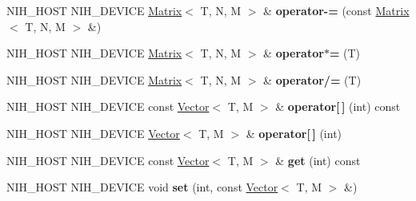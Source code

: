 \begin{DoxyCompactItemize}
\item 
\hypertarget{structnih_1_1_matrix_abb807e11d90f62076f083093ed4852c4}{
\-N\-I\-H\-\_\-\-H\-O\-S\-T \-N\-I\-H\-\_\-\-D\-E\-V\-I\-C\-E \hyperlink{structnih_1_1_matrix}{\-Matrix}$<$ \-T, \*
\-N, \-M $>$ \& {\bfseries operator-\/=} (const \hyperlink{structnih_1_1_matrix}{\-Matrix}$<$ \-T, \-N, \-M $>$ \&)}
\label{structnih_1_1_matrix_abb807e11d90f62076f083093ed4852c4}

\item 
\hypertarget{structnih_1_1_matrix_a2f749df29033f0659b3de33cca270b1d}{
\-N\-I\-H\-\_\-\-H\-O\-S\-T \-N\-I\-H\-\_\-\-D\-E\-V\-I\-C\-E \hyperlink{structnih_1_1_matrix}{\-Matrix}$<$ \-T, \*
\-N, \-M $>$ \& {\bfseries operator$\ast$=} (\-T)}
\label{structnih_1_1_matrix_a2f749df29033f0659b3de33cca270b1d}

\item 
\hypertarget{structnih_1_1_matrix_a0b8324135764fc785a39bcc7737c53f2}{
\-N\-I\-H\-\_\-\-H\-O\-S\-T \-N\-I\-H\-\_\-\-D\-E\-V\-I\-C\-E \hyperlink{structnih_1_1_matrix}{\-Matrix}$<$ \-T, \*
\-N, \-M $>$ \& {\bfseries operator/=} (\-T)}
\label{structnih_1_1_matrix_a0b8324135764fc785a39bcc7737c53f2}

\item 
\hypertarget{structnih_1_1_matrix_a7d8d41af5d8c106a2a62c27c6271c318}{
\-N\-I\-H\-\_\-\-H\-O\-S\-T \-N\-I\-H\-\_\-\-D\-E\-V\-I\-C\-E const \*
\hyperlink{structnih_1_1_vector}{\-Vector}$<$ \-T, \-M $>$ \& {\bfseries operator\mbox{[}$\,$\mbox{]}} (int) const }
\label{structnih_1_1_matrix_a7d8d41af5d8c106a2a62c27c6271c318}

\item 
\hypertarget{structnih_1_1_matrix_a4925f21801c31cc9388d6f8eb1f4ab96}{
\-N\-I\-H\-\_\-\-H\-O\-S\-T \-N\-I\-H\-\_\-\-D\-E\-V\-I\-C\-E \hyperlink{structnih_1_1_vector}{\-Vector}$<$ \-T, \*
\-M $>$ \& {\bfseries operator\mbox{[}$\,$\mbox{]}} (int)}
\label{structnih_1_1_matrix_a4925f21801c31cc9388d6f8eb1f4ab96}

\item 
\hypertarget{structnih_1_1_matrix_a395ae2b1d7ac2d89345384ccbe8a76ae}{
\-N\-I\-H\-\_\-\-H\-O\-S\-T \-N\-I\-H\-\_\-\-D\-E\-V\-I\-C\-E const \*
\hyperlink{structnih_1_1_vector}{\-Vector}$<$ \-T, \-M $>$ \& {\bfseries get} (int) const }
\label{structnih_1_1_matrix_a395ae2b1d7ac2d89345384ccbe8a76ae}

\item 
\hypertarget{structnih_1_1_matrix_aecc60423b4fcded657b4f9bf42e25c5c}{
\-N\-I\-H\-\_\-\-H\-O\-S\-T \-N\-I\-H\-\_\-\-D\-E\-V\-I\-C\-E void {\bfseries set} (int, const \hyperlink{structnih_1_1_vector}{\-Vector}$<$ \-T, \-M $>$ \&)}
\label{structnih_1_1_matrix_aecc60423b4fcded657b4f9bf42e25c5c}


\end{DoxyCompactItemize}
